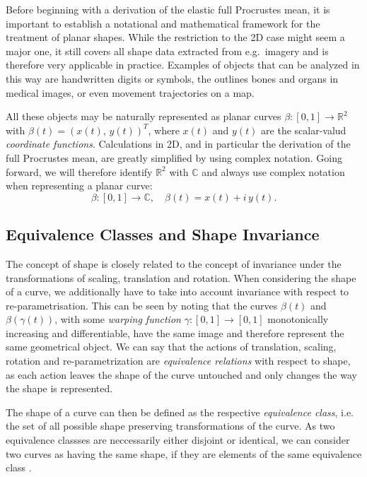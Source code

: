 Before beginning with a derivation of the elastic full Procrustes mean, it is
important to establish a notational and mathematical framework for the
treatment of planar shapes.
While the restriction to the 2D case might seem a major one, it still covers
all shape data extracted from e.g.\ imagery and is therefore very applicable in
practice.
Examples of objects that can be analyzed in this way are handwritten digits or
symbols, the outlines bones and organs in medical images, or even movement
trajectories on a map.

All these objects may be naturally represented as planar curves $\beta : [0,1]
\rightarrow \mathbb{R}^2$ with $\beta(t) = (x(t),\, y(t))^T$, where $x(t)$ and
$y(t)$ are the scalar-valud \textit{coordinate functions}.
Calculations in 2D, and in particular the derivation of the
full Procrustes mean, are greatly simplified by using complex notation.
Going forward, we will therefore identify $\mathbb{R}^2$ with $\mathbb{C}$ and
always use complex notation when representing a planar curve:
$$\beta : [0,1] \rightarrow \mathbb{C}, \quad \beta(t) = x(t) + i\, y(t).$$

\subsection{Equivalence Classes and Shape Invariance}
\label{theo:inv}
The concept of shape is closely related to the concept of invariance under the
transformations of scaling, translation and rotation.
When considering the shape of a curve, we additionally have to take into
account invariance with respect to re-parametrisation.
This can be seen by noting that the curves $\beta(t)$ and $\beta(\gamma(t))$,
with some \textit{warping function} $\gamma : [0,1] \rightarrow [0,1]$
monotonically increasing and differentiable, have the same image and therefore
represent the same geometrical object.
We can say that the actions of translation, scaling, rotation and
re-parametrization are \textit{equivalence relations} with respect to shape, as
each action leaves the shape of the curve untouched and only changes the way
the shape is represented.

The shape of a curve can then be defined as the respective \textit{equivalence
class}, i.e. the set of all possible shape preserving transformations of the
curve.
As two equivalence classses are neccessarily either disjoint or identical, we
can consider two curves as having the same shape, if they are elements of the
same equivalence class \parencite[see][40]{SrivastavaKlassen2016}.

